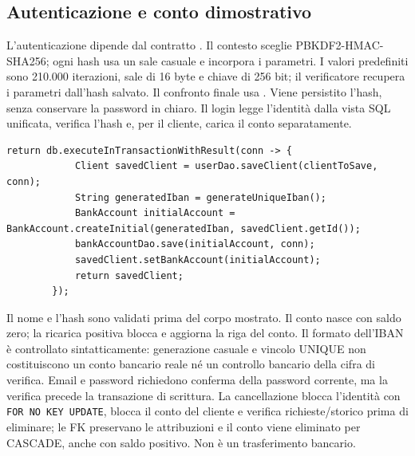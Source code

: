 {\raggedright
\subsection{Autenticazione e conto dimostrativo}
L'autenticazione dipende dal contratto .
Il contesto sceglie PBKDF2-HMAC-SHA256; ogni hash usa un sale casuale
e incorpora i parametri. I valori predefiniti sono 210.000 iterazioni,
sale di 16 byte e chiave di 256 bit; il verificatore recupera i parametri
dall'hash salvato. Il confronto finale usa .
Viene persistito l'hash, senza conservare la password in chiaro.
Il login legge l'identità dalla vista SQL unificata, verifica l'hash e,
per il cliente, carica il conto separatamente.\par}


\noindent\begin{minipage}{\linewidth}
\begin{lstlisting}[firstnumber=57,caption={\code{AuthService.java}: registrazione del cliente e conto iniziale nella stessa transazione.},
  label=lst:registrazione]
        return db.executeInTransactionWithResult(conn -> {
            Client savedClient = userDao.saveClient(clientToSave, conn);
            String generatedIban = generateUniqueIban();
            BankAccount initialAccount = BankAccount.createInitial(generatedIban, savedClient.getId());
            bankAccountDao.save(initialAccount, conn);
            savedClient.setBankAccount(initialAccount);
            return savedClient;
        });
\end{lstlisting}
\end{minipage}


Il nome e l'hash sono validati prima del corpo mostrato. Il conto nasce
con saldo zero; la ricarica positiva blocca e aggiorna la riga del conto.
Il formato dell'IBAN è controllato sintatticamente: generazione casuale
e vincolo UNIQUE non costituiscono un conto bancario reale né un controllo
bancario della cifra di verifica. Email e password richiedono conferma
della password corrente, ma la verifica precede la transazione di scrittura.
La cancellazione blocca l'identità con \texttt{FOR NO KEY UPDATE}, blocca
il conto del cliente e verifica richieste/storico prima di eliminare;
le FK preservano le attribuzioni e il conto viene eliminato per CASCADE,
anche con saldo positivo. Non è un trasferimento bancario.

